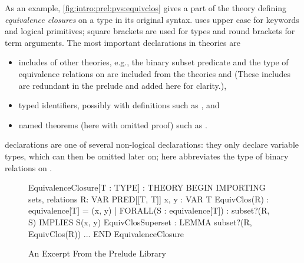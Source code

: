 As an example, \autoref{fig:intro:prel:pvs:equivclos} gives a part of the \pvs theory defining \emph{equivalence closures} on a type  in its original syntax.
\pvs uses upper case for keywords and logical primitives; square brackets are used for types and round brackets for term arguments.
The most important declarations in theories are 
\begin{itemize}
	\item includes of other theories, e.g., the binary subset predicate  and the type  of equivalence relations on  are included from the theories  and  (These includes are redundant in the \pvs prelude and added here for clarity.), 
	\item typed identifiers, possibly with definitions such as , and 
	\item named theorems (here with omitted proof) such as .
\end{itemize}

 declarations are one of several non-logical declarations: they only declare variable types, which can then be omitted later on; here  abbreviates the type of binary relations on .

\begin{figure}[ht]\centering
\begin{code}
EquivalenceClosure[T : TYPE] : THEORY
BEGIN
  IMPORTING sets, relations
  R: VAR PRED[[T, T]]
  x, y : VAR T
  EquivClos(R) : equivalence[T] =
    { (x, y) | FORALL(S : equivalence[T]) : subset?(R, S) IMPLIES S(x, y) }
  EquivClosSuperset : LEMMA
    subset?(R, EquivClos(R))
  ...
END EquivalenceClosure
\end{code}
\caption{An Excerpt From the \pvs Prelude Library}\label{fig:intro:prel:pvs:equivclos}
\end{figure}




